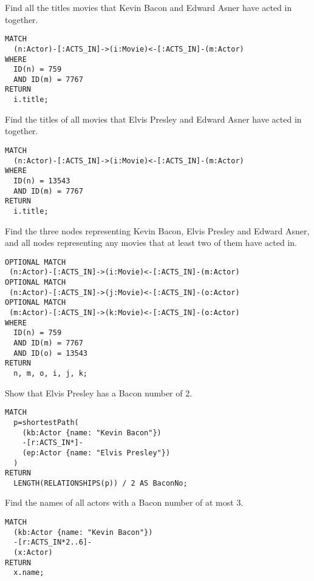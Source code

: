 \documentclass[a4paper, 12pt]{exam}
\begin{document}
\begin{questions}
\question
Find all the titles movies that Kevin Bacon and Edward Asner have acted in together.
\begin{solution}
  \begin{verbatim}
MATCH
  (n:Actor)-[:ACTS_IN]->(i:Movie)<-[:ACTS_IN]-(m:Actor)
WHERE
  ID(n) = 759
  AND ID(m) = 7767
RETURN
  i.title;
  \end{verbatim}
\end{solution}

\question
Find the titles of all movies that Elvis Presley and Edward Asner have acted in together.
\begin{solution}
  \begin{verbatim}
MATCH
  (n:Actor)-[:ACTS_IN]->(i:Movie)<-[:ACTS_IN]-(m:Actor)
WHERE
  ID(n) = 13543
  AND ID(m) = 7767
RETURN
  i.title;
  \end{verbatim}
\end{solution}

\question
Find the three nodes representing Kevin Bacon, Elvis Presley and Edward Asner, and all nodes representing any movies that at least two of them have acted in.
\begin{solution}
  \begin{verbatim}
OPTIONAL MATCH
 (n:Actor)-[:ACTS_IN]->(i:Movie)<-[:ACTS_IN]-(m:Actor)
OPTIONAL MATCH
 (n:Actor)-[:ACTS_IN]->(j:Movie)<-[:ACTS_IN]-(o:Actor)
OPTIONAL MATCH
 (m:Actor)-[:ACTS_IN]->(k:Movie)<-[:ACTS_IN]-(o:Actor)
WHERE
  ID(n) = 759
  AND ID(m) = 7767
  AND ID(o) = 13543
RETURN
  n, m, o, i, j, k;
  \end{verbatim}
\end{solution}

\question
Show that Elvis Presley has a Bacon number of 2.
\begin{solution}
  \begin{verbatim}
MATCH
  p=shortestPath(
    (kb:Actor {name: "Kevin Bacon"})
    -[r:ACTS_IN*]-
    (ep:Actor {name: "Elvis Presley"})
  )
RETURN
  LENGTH(RELATIONSHIPS(p)) / 2 AS BaconNo;
  \end{verbatim}
\end{solution}

\question
Find the names of all actors with a Bacon number of at most 3.
\begin{solution}
  \begin{verbatim}
MATCH
  (kb:Actor {name: "Kevin Bacon"})
  -[r:ACTS_IN*2..6]-
  (x:Actor)
RETURN
  x.name;
  \end{verbatim}
\end{solution}


\end{questions}
\end{document}
